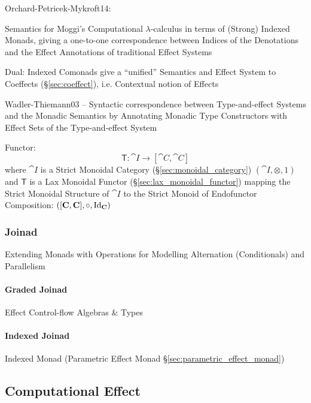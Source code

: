 Orchard-Petricek-Mykroft14:

Semantics for Moggi's Computational $\lambda$-calculus in terms of
(Strong) Indexed Monads, giving a one-to-one correspondence between
Indices of the Denotations and the Effect Annotations of traditional
Effect Systems

Dual: Indexed Comonads give a ``unified'' Semantics and Effect System
to Coeffects (\S\ref{sec:coeffect}), i.e. Contextual notion of Effects

Wadler-Thiemann03 -- Syntactic correspondence between Type-and-effect
Systems and the Monadic Semantics by Annotating Monadic Type
Constructors with Effect Sets of the Type-and-effect System

Functor:
\[
  \mathsf{T} : \cat{I} \rightarrow [\cat{C},\cat{C}]
\]
where $\cat{I}$ is a Strict Monoidal Category
(\S\ref{sec:monoidal_category}) $(\cat{I}, \otimes, 1)$ and
$\mathsf{T}$ is a Lax Monoidal Functor
(\S\ref{sec:lax_monoidal_functor}) mapping the Strict Monoidal
Structure of $\cat{I}$ to the Strict Monoid of Endofunctor
Composition: $([\mathbf{C},\mathbf{C}],\circ,\mathrm{Id}_\mathbf{C})$



\subsubsection{Joinad}\label{sec:joinad}

Extending Monads with Operations for Modelling Alternation
(Conditionals) and Parallelism



\paragraph{Graded Joinad}\label{sec:graded_joinad}\hfill

Effect Control-flow Algebras \& Types



\paragraph{Indexed Joinad}\label{sec:indexed_joinad}\hfill

Indexed Monad (Parametric Effect Monad
\S\ref{sec:parametric_effect_monad})



\subsection{Computational Effect}\label{sec:computational_effect}

